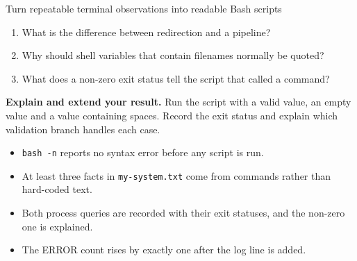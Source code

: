 \begin{labproject}{Turn repeatable terminal observations into readable Bash scripts}
\begin{quickcheck}
\begin{enumerate}
  \item What is the difference between redirection and a pipeline?
  \item Why should shell variables that contain filenames normally be quoted?
  \item What does a non-zero exit status tell the script that called a command?
\end{enumerate}
\end{quickcheck}

\begin{verification}
\textbf{Explain and extend your result.} Run the script with a valid value, an empty value and a value containing spaces. Record the exit status and explain which validation branch handles each case.


\begin{itemize}
  \item \texttt{bash -n} reports no syntax error before any script is run.
  \item At least three facts in \texttt{my-system.txt} come from commands rather than hard-coded text.
  \item Both process queries are recorded with their exit statuses, and the non-zero one is explained.
  \item The ERROR count rises by exactly one after the log line is added.
\end{itemize}
\end{verification}
\end{labproject}
